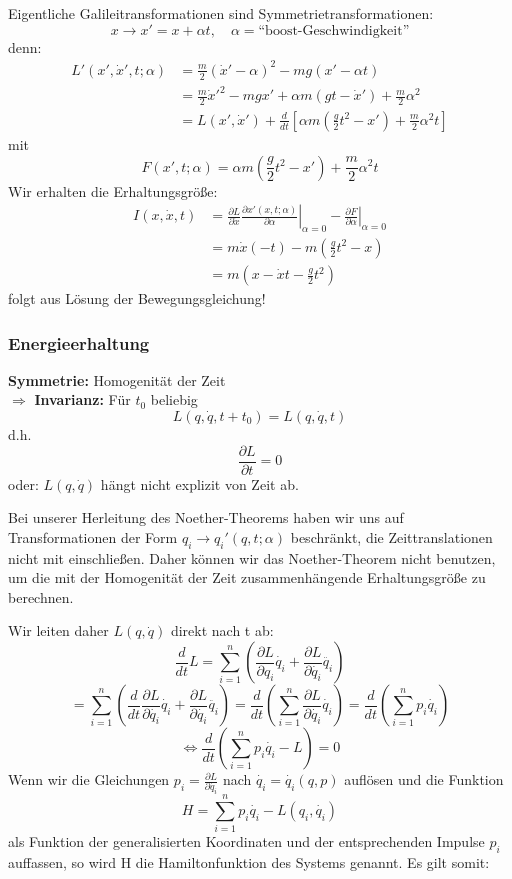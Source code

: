 \documentclass[10pt, letterpaper]{article}
\begin{document}
Eigentliche Galileitransformationen sind Symmetrietransformationen:
\[x \to x' = x + \alpha t, \quad \alpha = \text{``boost-Geschwindigkeit''}\]
denn:
\begin{align*}
L'(x',\dot{x}',t;\alpha) &= \frac{m}{2}(\dot{x}'-\alpha)^2 - mg(x'-\alpha t) \\
&= \frac{m}{2}\dot{x}'^2 - mgx' + \alpha m\left(gt-\dot{x}'\right) + \frac{m}{2}\alpha^2 \\
&= L(x',\dot{x}') + \frac{d}{dt}\left[\alpha m\left(\frac{g}{2}t^2-x'\right) + \frac{m}{2}\alpha^2t\right]
\end{align*}
mit 
$$F(x',t;\alpha)=\alpha m\left(\frac{g}{2}t^2-x'\right) + \frac{m}{2}\alpha^2t$$
Wir erhalten die Erhaltungsgröße:
\begin{align*}
I(x,\dot{x},t) &= \frac{\partial L}{\partial \dot{x}}\left.\frac{\partial x'(x,t;\alpha)}{\partial \alpha}\right|_{\alpha=0} - \left.\frac{\partial F}{\partial \alpha}\right|_{\alpha=0} \\
&= m\dot{x}(-t) - m\left(\frac{g}{2}t^2-x\right) \\
&= m\left(x-\dot{x}t - \frac{g}{2}t^2\right)
\end{align*}
folgt aus Lösung der Bewegungsgleichung!




\subsubsection{Energieerhaltung}


\textbf{Symmetrie:} Homogenität der Zeit\\

$\Rightarrow$ \textbf{Invarianz:} Für $t_0$ beliebig
$$L(q,\dot{q},t+t_0) = L(q,\dot{q},t)$$ 
d.h. 
$$\frac{\partial L}{\partial t} = 0$$
oder: $L(q,\dot{q})$ hängt nicht explizit von Zeit ab.


Bei unserer Herleitung des Noether-Theorems haben wir uns auf Transformationen der Form $q_i \to q_i'(q,t;\alpha)$ beschränkt, die Zeittranslationen nicht mit einschließen. Daher können wir das Noether-Theorem nicht benutzen, um die mit der Homogenität der Zeit zusammenhängende Erhaltungsgröße zu berechnen.


Wir leiten daher $L(q,\dot{q})$ direkt nach t ab:
\[\frac{d}{dt}L = \sum_{i=1}^n \left(\frac{\partial L}{\partial q_i}\dot{q_i} + \frac{\partial L}{\partial \dot{q_i}}\ddot{q_i}\right)\]
\[= \sum_{i=1}^n \left(\frac{d}{dt}\frac{\partial L}{\partial \dot{q_i}}\dot{q_i} + \frac{\partial L}{\partial \dot{q_i}}\ddot{q_i}\right) = \frac{d}{dt}\left(\sum_{i=1}^n \frac{\partial L}{\partial \dot{q_i}}\dot{q_i}\right) = \frac{d}{dt}\left(\sum_{i=1}^n p_i\dot{q_i}\right)\]
\[\Leftrightarrow \frac{d}{dt}\left(\sum_{i=1}^n p_i\dot{q_i} - L\right) = 0\]
Wenn wir die Gleichungen $p_i = \frac{\partial L}{\partial \dot{q_i}}$ nach $\dot{q_i} = \dot{q_i}(q,p)$ auflösen und die Funktion
\[H = \sum_{i=1}^n p_i\dot{q_i} - L(q_i,\dot{q_i})\]
als Funktion der generalisierten Koordinaten und der entsprechenden Impulse $p_i$ auffassen, so wird H die Hamiltonfunktion des Systems genannt. Es gilt somit:
\end{document}
